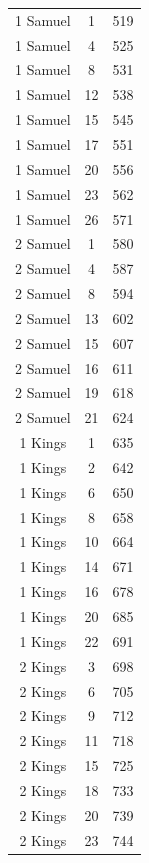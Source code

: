 \documentclass{article}
\newlength{\minipageheight}
\newlength{\minipagewidth}
\begin{document}
\begin{minipage}[r][\minipageheight][t]{\minipagewidth}
\begin{center}
\begin{tabular}{|c|c|c|}
            1 Samuel    & 1       & 519    \\
            1 Samuel    & 4       & 525    \\
            1 Samuel    & 8       & 531    \\
            1 Samuel    & 12      & 538    \\
            1 Samuel    & 15      & 545    \\
            1 Samuel    & 17      & 551    \\
            1 Samuel    & 20      & 556    \\
            1 Samuel    & 23      & 562    \\
            1 Samuel    & 26      & 571    \\
            2 Samuel    & 1       & 580    \\
            2 Samuel    & 4       & 587    \\
            2 Samuel    & 8       & 594    \\
            2 Samuel    & 13      & 602    \\
            2 Samuel    & 15      & 607    \\
            2 Samuel    & 16      & 611    \\
            2 Samuel    & 19      & 618    \\
            2 Samuel    & 21      & 624    \\
            1 Kings     & 1       & 635    \\
            1 Kings     & 2       & 642    \\
            1 Kings     & 6       & 650    \\
            1 Kings     & 8       & 658    \\
            1 Kings     & 10      & 664    \\
            1 Kings     & 14      & 671    \\
            1 Kings     & 16      & 678    \\
            1 Kings     & 20      & 685    \\
            1 Kings     & 22      & 691    \\
            2 Kings     & 3       & 698    \\
            2 Kings     & 6       & 705    \\
            2 Kings     & 9       & 712    \\
            2 Kings     & 11      & 718    \\
            2 Kings     & 15      & 725    \\
            2 Kings     & 18      & 733    \\
            2 Kings     & 20      & 739    \\
            2 Kings     & 23      & 744    \\
            \hline
        \end{tabular}
    \end{center}
\end{minipage}%
\end{document}
